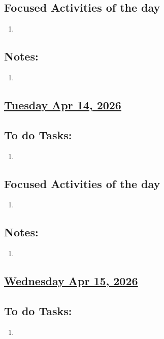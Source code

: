 \subsection*{Focused Activities of the day}
\begin{enumerate}[\ding{212}]  
    \item  
\end{enumerate}
\subsection*{Notes:}
\begin{enumerate}
    \item 
\end{enumerate}
\subsection*{\underline{Tuesday Apr 14, 2026}}
\subsection*{To do Tasks:}
\begin{enumerate}
    \item 
\end{enumerate}
\subsection*{Focused Activities of the day}
\begin{enumerate}[\ding{212}]  
    \item  
\end{enumerate}
\subsection*{Notes:}
\begin{enumerate}
    \item 
\end{enumerate}
\subsection*{\underline{Wednesday Apr 15, 2026} }
\subsection*{To do Tasks:}
\begin{enumerate}
    \item 
\end{enumerate}
